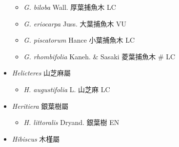 \begin{itemize}
  \begin{itemize}
        \item[] \textit{G. biloba} Wall.  厚葉捕魚木   LC
        \item[] \textit{G. eriocarpa} Juss.  大葉捕魚木   VU
        \item[] \textit{G. piscatorum} Hance  小葉捕魚木   LC
        \item[] \textit{G. rhombifolia} Kaneh. \& Sasaki  菱葉捕魚木  \# LC
  \end{itemize}
 \item[] \textit{Helicteres} 山芝麻屬
                                
  \begin{itemize}
        \item[] \textit{H. augustifolia} L.  山芝麻   LC
  \end{itemize}
 \item[] \textit{Heritiera} 銀葉樹屬
                                
  \begin{itemize}
        \item[] \textit{H. littoralis} Dryand.  銀葉樹   EN
  \end{itemize}
 \item[] \textit{Hibiscus} 木槿屬
                                

\end{itemize}
